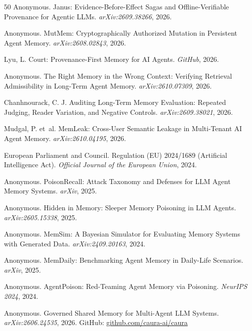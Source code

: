 \documentclass{article}
\begin{document}
\begin{thebibliography}{50}
Anonymous.
\newblock Janus: Evidence-Before-Effect Sagas and Offline-Verifiable Provenance for Agentic LLMs.
\newblock \emph{arXiv:2609.38266}, 2026.

Anonymous.
\newblock MutMem: Cryptographically Authorized Mutation in Persistent Agent Memory.
\newblock \emph{arXiv:2608.02843}, 2026.

Lyu, L.
\newblock Court: Provenance-First Memory for AI Agents.
\newblock \emph{GitHub}, 2026.

Anonymous.
\newblock The Right Memory in the Wrong Context: Verifying Retrieval Admissibility in Long-Term Agent Memory.
\newblock \emph{arXiv:2610.07309}, 2026.

Chanhnourack, C. J.
\newblock Auditing Long-Term Memory Evaluation: Repeated Judging, Reader Variation, and Negative Controls.
\newblock \emph{arXiv:2609.38021}, 2026.

Mudgal, P. et~al.
\newblock MemLeak: Cross-User Semantic Leakage in Multi-Tenant AI Agent Memory.
\newblock \emph{arXiv:2610.04195}, 2026.

European Parliament and Council.
\newblock Regulation (EU) 2024/1689 (Artificial Intelligence Act).
\newblock \emph{Official Journal of the European Union}, 2024.


Anonymous.
\newblock PoisonRecall: Attack Taxonomy and Defenses for LLM Agent Memory Systems.
\newblock \emph{arXiv}, 2025.

Anonymous.
\newblock Hidden in Memory: Sleeper Memory Poisoning in LLM Agents.
\newblock \emph{arXiv:2605.15338}, 2025.

Anonymous.
\newblock MemSim: A Bayesian Simulator for Evaluating Memory Systems with Generated Data.
\newblock \emph{arXiv:2409.20163}, 2024.

Anonymous.
\newblock MemDaily: Benchmarking Agent Memory in Daily-Life Scenarios.
\newblock \emph{arXiv}, 2025.

Anonymous.
\newblock AgentPoison: Red-Teaming Agent Memory via Poisoning.
\newblock \emph{NeurIPS 2024}, 2024.


Anonymous.
\newblock Governed Shared Memory for Multi-Agent LLM Systems.
\newblock \emph{arXiv:2606.24535}, 2026. GitHub: \url{github.com/caura-ai/caura}


\end{thebibliography}
\end{document}
